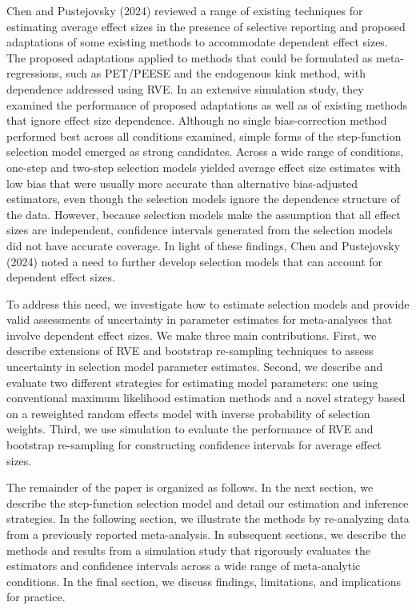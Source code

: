 \documentclass[
  man, donotrepeattitle,floatsintext]{apa7}
\begin{document}
Chen and Pustejovsky (2024) reviewed a range of existing techniques for estimating average effect sizes in the presence of selective reporting and proposed adaptations of some existing methods to accommodate dependent effect sizes.
The proposed adaptations applied to methods that could be formulated as meta-regressions, such as PET/PEESE and the endogenous kink method, with dependence addressed using RVE.
In an extensive simulation study, they examined the performance of proposed adaptations as well as of existing methods that ignore effect size dependence.
Although no single bias-correction method performed best across all conditions examined, simple forms of the step-function selection model emerged as strong candidates.
Across a wide range of conditions, one-step and two-step selection models yielded average effect size estimates with low bias that were usually more accurate than alternative bias-adjusted estimators, even though the selection models ignore the dependence structure of the data.
However, because selection models make the assumption that all effect sizes are independent, confidence intervals generated from the selection models did not have accurate coverage.
In light of these findings, Chen and Pustejovsky (2024) noted a need to further develop selection models that can account for dependent effect sizes.

To address this need, we investigate how to estimate selection models and provide valid assessments of uncertainty in parameter estimates for meta-analyses that involve dependent effect sizes.
We make three main contributions.
First, we describe extensions of RVE and bootstrap re-sampling techniques to assess uncertainty in selection model parameter estimates.
Second, we describe and evaluate two different strategies for estimating model parameters: one using conventional maximum likelihood estimation methods and a novel strategy based on a reweighted random effects model with inverse probability of selection weights.
Third, we use simulation to evaluate the performance of RVE and bootstrap re-sampling for constructing confidence intervals for average effect sizes.

The remainder of the paper is organized as follows.
In the next section, we describe the step-function selection model and detail our estimation and inference strategies.
In the following section, we illustrate the methods by re-analyzing data from a previously reported meta-analysis.
In subsequent sections, we describe the methods and results from a simulation study that rigorously evaluates the estimators and confidence intervals across a wide range of meta-analytic conditions.
In the final section, we discuss findings, limitations, and implications for practice.
\end{document}
